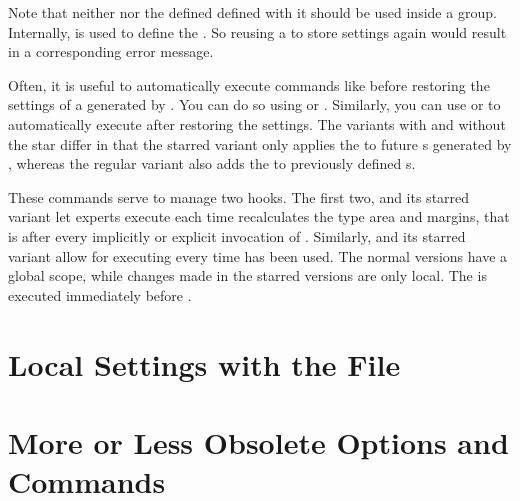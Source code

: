 Note that neither  nor the defined
 defined with it should be used inside a group.
Internally,
 is
used to define the . So reusing a
 to store settings again would result in a
corresponding error message.

Often, it is useful to automatically
execute commands like  before
restoring the settings of a  generated by .
You can do so using  or .
Similarly, you can use  or 
to automatically execute  after restoring the settings. The
variants with and without the star differ in that the starred variant only
applies the  to future s generated by
, whereas the regular variant also adds the  to
previously defined s.%
\EndIndexGroup


\begin{Declaration}
\end{Declaration}%
These commands serve to manage two hooks. The first two,
 and its starred variant let experts execute
 each time  recalculates the type area and
margins, that is after every implicitly or explicit invocation of
. Similarly,
 and its starred
variant allow for executing  every time
 has been used. The normal versions have a
global scope, while changes made in the starred versions are only local. The
 is executed immediately before .%
% 
\EndIndexGroup


\section{Local Settings with the  File}
\BeginIndexGroup
{}

%
\EndIndexGroup

\section{More or Less Obsolete Options and Commands}
%
\EndIndexGroup

\endinput

